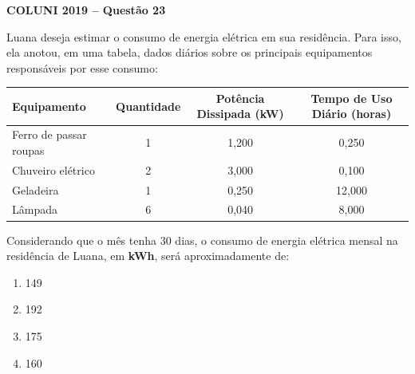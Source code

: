 \textbf{COLUNI 2019 -- Questão 23}\par\medskip Luana deseja estimar o consumo de energia elétrica em sua residência. Para isso, ela anotou, em uma tabela, dados diários sobre os principais equipamentos responsáveis por esse consumo:

\par

\begin{center}
\begin{tabular}{|l|c|c|c|}
\hline
\textbf{Equipamento} & \textbf{Quantidade} & \textbf{Potência Dissipada (kW)} & \textbf{Tempo de Uso Diário (horas)} \\ \hline
Ferro de passar roupas & 1 & 1,200 & 0,250 \\ \hline
Chuveiro elétrico & 2 & 3,000 & 0,100 \\ \hline
Geladeira & 1 & 0,250 & 12,000 \\ \hline
Lâmpada & 6 & 0,040 & 8,000 \\ \hline
\end{tabular}
\end{center}

\par

Considerando que o mês tenha 30 dias, o consumo de energia elétrica mensal na residência de Luana, em \textbf{kWh}, será aproximadamente de:

\par

\begin{enumerate}
\item 149
\item 192
\item 175
\item 160
\end{enumerate}
